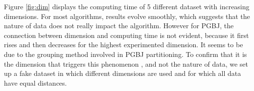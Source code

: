 Figure \ref{fig:dim} displays the computing time of 5 different dataset with increasing dimensions. For most algorithms, results evolve smoothly, which suggests that the nature of data does not really impact the algorithm. However for PGBJ, the connection between dimension and computing time is not evident, because it first rises and then decreases for the highest experimented dimension. It seems to be due to the grouping method involved in PGBJ partitioning.
To confirm that it is the dimension that triggers this phenomenon , and not the nature of data, we set up a  fake dataset in which different dimensions are used and for which all data have equal distances. 

